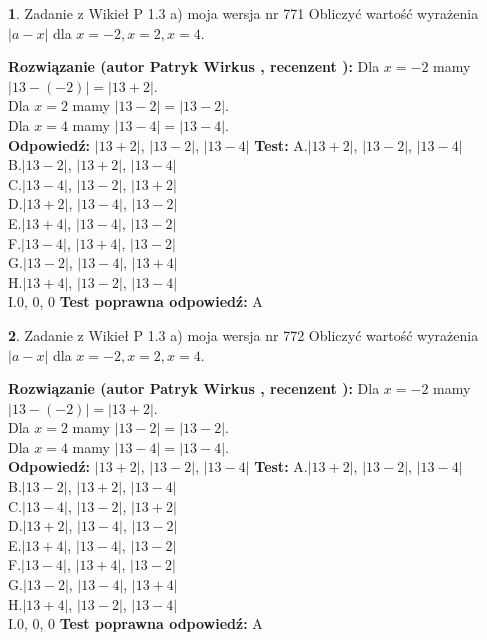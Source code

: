 \documentclass[12pt, a4paper]{article}
\theoremstyle{definition} %
\newtheorem{zad}{}
\newcommand{\zadStart}[1]{\begin{zad}#1\newline}
\newcommand{\zadStop}{\end{zad}}
\newcommand{\rozwStart}[2]{\noindent \textbf{Rozwiązanie (autor #1 , recenzent #2): }\newline}
\newcommand{\rozwStop}{\newline}
\newcommand{\odpStart}{\noindent \textbf{Odpowiedź:}\newline}
\newcommand{\odpStop}{\newline}
\newcommand{\testStart}{\noindent \textbf{Test:}\newline}
\newcommand{\testStop}{\newline}
\newcommand{\kluczStart}{\noindent \textbf{Test poprawna odpowiedź:}\newline}
\newcommand{\kluczStop}{\newline}
\begin{document}
\zadStart{Zadanie z Wikieł P 1.3 a) moja wersja nr 771}
Obliczyć wartość wyrażenia $|a - x|$ dla $x=-2,x=2,x=4$.
\zadStop
\rozwStart{Patryk Wirkus}{}
Dla $x = -2$ mamy $|13 - (-2)| = |13 + 2|$.\\
Dla $x = 2$ mamy $|13 - 2| = |13 - 2|$.\\
Dla $x = 4$ mamy $|13 - 4| = |13 - 4|$.\\
\rozwStop
\odpStart
$|13 + 2|$, $|13 - 2|$, $|13 - 4|$
\odpStop
\testStart
A.$|13 + 2|$, $|13 - 2|$, $|13 - 4|$\\
B.$|13 - 2|$, $|13 + 2|$, $|13 - 4|$\\
C.$|13 - 4|$, $|13 - 2|$, $|13 + 2|$\\
D.$|13 + 2|$, $|13 - 4|$, $|13 - 2|$\\
E.$|13 + 4|$, $|13 - 4|$, $|13 - 2|$\\
F.$|13 - 4|$, $|13 + 4|$, $|13 - 2|$\\
G.$|13 - 2|$, $|13 - 4|$, $|13 + 4|$\\
H.$|13 + 4|$, $|13 - 2|$, $|13 - 4|$\\
I.$0$, $0$, $0$
\testStop
\kluczStart
A
\kluczStop



\zadStart{Zadanie z Wikieł P 1.3 a) moja wersja nr 772}
Obliczyć wartość wyrażenia $|a - x|$ dla $x=-2,x=2,x=4$.
\zadStop
\rozwStart{Patryk Wirkus}{}
Dla $x = -2$ mamy $|13 - (-2)| = |13 + 2|$.\\
Dla $x = 2$ mamy $|13 - 2| = |13 - 2|$.\\
Dla $x = 4$ mamy $|13 - 4| = |13 - 4|$.\\
\rozwStop
\odpStart
$|13 + 2|$, $|13 - 2|$, $|13 - 4|$
\odpStop
\testStart
A.$|13 + 2|$, $|13 - 2|$, $|13 - 4|$\\
B.$|13 - 2|$, $|13 + 2|$, $|13 - 4|$\\
C.$|13 - 4|$, $|13 - 2|$, $|13 + 2|$\\
D.$|13 + 2|$, $|13 - 4|$, $|13 - 2|$\\
E.$|13 + 4|$, $|13 - 4|$, $|13 - 2|$\\
F.$|13 - 4|$, $|13 + 4|$, $|13 - 2|$\\
G.$|13 - 2|$, $|13 - 4|$, $|13 + 4|$\\
H.$|13 + 4|$, $|13 - 2|$, $|13 - 4|$\\
I.$0$, $0$, $0$
\testStop
\kluczStart
A
\kluczStop
\end{document}
